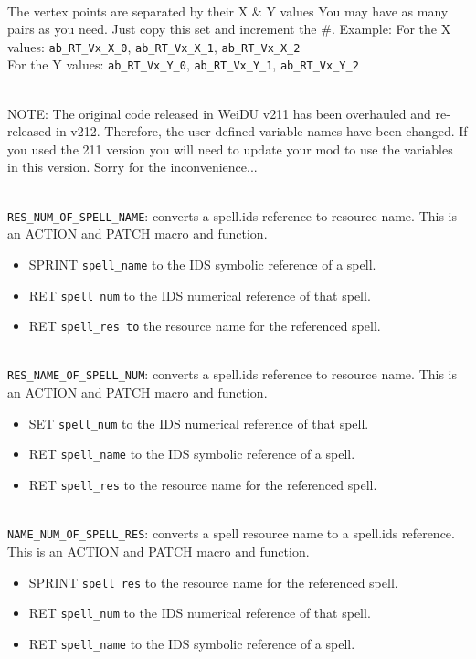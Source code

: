 \documentclass{article}
\begin{document}
\\
The vertex points are separated by their X & Y values
You may have as many pairs as you need. Just copy this set and increment the #.
Example: For the X values: \verb+ab_RT_Vx_X_0+, \verb+ab_RT_Vx_X_1+, \verb+ab_RT_Vx_X_2+\\
         For the Y values: \verb+ab_RT_Vx_Y_0+, \verb+ab_RT_Vx_Y_1+, \verb+ab_RT_Vx_Y_2+

\\
NOTE: The original code released in WeiDU v211 has been overhauled and re-released in v212. Therefore, the user defined variable names have been changed. If you used the 211 version you will need to update your mod to use the variables in this version. Sorry for the inconvenience...


\\
\verb+RES_NUM_OF_SPELL_NAME+: converts a spell.ids reference to resource name.
This is an ACTION and PATCH macro and function.
\begin{itemize}
\item SPRINT \verb+spell_name+ to the IDS symbolic reference of a spell.
\item RET \verb+spell_num+ to the IDS numerical reference of that spell.
\item RET \verb+spell_res to+ the resource name for the referenced spell.
\end{itemize}
\\

\verb+RES_NAME_OF_SPELL_NUM+: converts a spell.ids reference to resource name.
This is an ACTION and PATCH macro and function.
\begin{itemize}
\item SET \verb+spell_num+ to the IDS numerical reference of that spell.
\item RET \verb+spell_name+ to the IDS symbolic reference of a spell.
\item RET \verb+spell_res+ to the resource name for the referenced spell.
\end{itemize}
\\

\verb+NAME_NUM_OF_SPELL_RES+: converts a spell resource name to a spell.ids reference.
This is an ACTION and PATCH macro and function.
\begin{itemize}
\item SPRINT \verb+spell_res+ to the resource name for the referenced spell.
\item RET \verb+spell_num+ to the IDS numerical reference of that spell.
\item RET \verb+spell_name+ to the IDS symbolic reference of a spell.
\end{itemize}
\\
\end{document}
